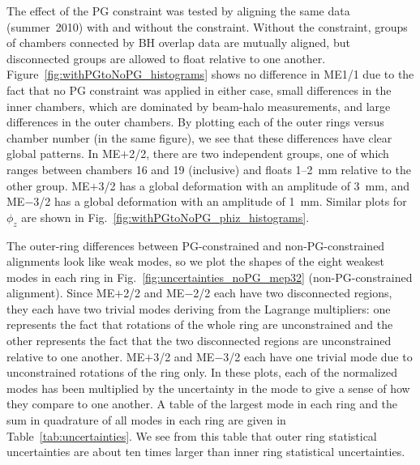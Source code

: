 \documentclass[12pt]{article}
\begin{document}
The effect of the PG constraint was tested by aligning the same data
(summer~2010) with and without the constraint.  Without the
constraint, groups of chambers connected by BH overlap data are
mutually aligned, but disconnected groups are allowed to float
relative to one another.  Figure~\ref{fig:withPGtoNoPG_histograms}
shows no difference in ME1/1 due to the fact that no PG constraint was
applied in either case, small differences in the inner chambers, which
are dominated by beam-halo measurements, and large differences in the
outer chambers.  By plotting each of the outer rings versus chamber
number (in the same figure), we see that these differences have clear
global patterns.  In ME$+$2/2, there are two independent groups, one
of which ranges between chambers 16 and 19 (inclusive) and floats
1--2~mm relative to the other group.  ME$+$3/2 has a global
deformation with an amplitude of 3~mm, and ME$-$3/2 has a global
deformation with an amplitude of 1~mm.  Similar plots for $\phi_z$ are
shown in Fig.~\ref{fig:withPGtoNoPG_phiz_histograms}.

The outer-ring differences between PG-constrained and
non-PG-constrained alignments look like weak modes, so we plot the
shapes of the eight weakest modes in each ring in
Fig.~\ref{fig:uncertainties_noPG_mep32} (non-PG-constrained
alignment).  Since ME$+$2/2 and ME$-$2/2 each have two disconnected
regions, they each have two trivial modes deriving from the Lagrange
multipliers: one represents the fact that rotations of the whole ring
are unconstrained and the other represents the fact that the two
disconnected regions are unconstrained relative to one another.
ME$+$3/2 and ME$-$3/2 each have one trivial mode due to unconstrained
rotations of the ring only.  In these plots, each of the normalized
modes has been multiplied by the uncertainty in the mode to give a
sense of how they compare to one another.  A table of the largest mode
in each ring and the sum in quadrature of all modes in each ring are
given in Table~\ref{tab:uncertainties}.  We see from this table that
outer ring statistical uncertainties are about ten times larger than
inner ring statistical uncertainties.
\end{document}
